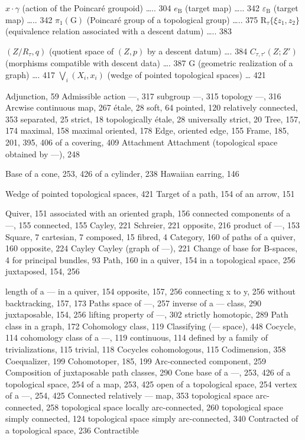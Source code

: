 \(x \cdot \gamma\) (action of the Poincaré groupoid) \ldots.. 304 \(e_{\mathrm{B}}\) (target map) \ldots.. 342 \(\varepsilon_{\mathrm{B}}\) (target map) \ldots.. 342 \(\pi_{1}(\mathrm{G})\) (Poincaré group of a topological group) \ldots.. 375 \(\mathrm{R}_{\tau} \{\xi z_{1}, z_{2}\}\) (equivalence relation associated with a descent datum) \ldots.. 383

\((Z/R_{\tau},q)\) (quotient space of \((Z,p)\) by a descent datum) \ldots. 384 \(C_{\tau,\tau'}(Z;Z')\) (morphisms compatible with descent data) \ldots. 387 \textbar G\textbar{} (geometric realization of a graph) \ldots. 417 \(\bigvee_{i}(X_{i},x_{i})\) (wedge of pointed topological spaces) \ldots{} 421



Adjunction, 59 Admissible action ---, 317 subgroup ---, 315 topology ---, 316 Arcwise continuous map, 267 étale, 28 soft, 64 pointed, 120 relatively connected, 353 separated, 25 strict, 18 topologically étale, 28 universally strict, 20 Tree, 157, 174 maximal, 158 maximal oriented, 178 Edge, oriented edge, 155 Frame, 185, 201, 395, 406 of a covering, 409 Attachment Attachment (topological space obtained by ---), 248


Base of a cone, 253, 426 of a cylinder, 238 Hawaiian earring, 146

Wedge of pointed topological spaces, 421 Target of a path, 154 of an arrow, 151


Quiver, 151 associated with an oriented graph, 156 connected components of a ---, 155 connected, 155 Cayley, 221 Schreier, 221 opposite, 216 product of ---, 153 Square, 7 cartesian, 7 composed, 15 fibred, 4 Category, 160 of paths of a quiver, 160 opposite, 224 Cayley Cayley (graph of ---), 221 Change of base for B-spaces, 4 for principal bundles, 93 Path, 160 in a quiver, 154 in a topological space, 256 juxtaposed, 154, 256

length of a --- in a quiver, 154 opposite, 157, 256 connecting x to y, 256 without backtracking, 157, 173 Paths space of ---, 257 inverse of a --- class, 290 juxtaposable, 154, 256 lifting property of ---, 302 strictly homotopic, 289 Path class in a graph, 172 Cohomology class, 119 Classifying (--- space), 448 Cocycle, 114 cohomology class of a ---, 119 continuous, 114 defined by a family of trivializations, 115 trivial, 118 Cocycles cohomologous, 115 Codimension, 358 Coequalizer, 199 Cohomotoper, 185, 199 Arc-connected component, 259 Composition of juxtaposable path classes, 290 Cone base of a ---, 253, 426 of a topological space, 254 of a map, 253, 425 open of a topological space, 254 vertex of a ---, 254, 425 Connected relatively --- map, 353 topological space arc-connected, 258 topological space locally arc-connected, 260 topological space simply connected, 124 topological space simply arc-connected, 340 Contracted of a topological space, 236 Contractible


